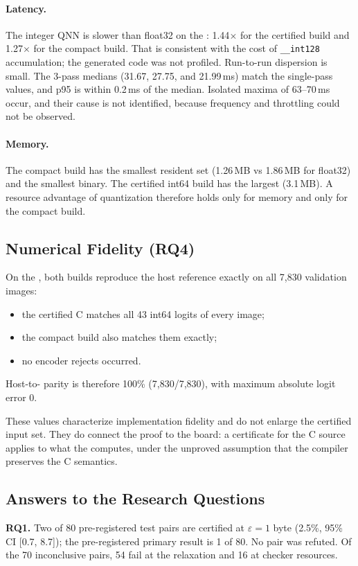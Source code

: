\paragraph{Latency.}
The integer QNN is slower than float32 on the \Aseven{}: 1.44$\times$ for the certified build and 1.27$\times$ for the compact build. That is consistent with the cost of \texttt{\_\_int128} accumulation; the generated code was not profiled. Run-to-run dispersion is small. The 3-pass medians (31.67, 27.75, and 21.99\,ms) match the single-pass values, and p95 is within 0.2\,ms of the median. Isolated maxima of 63--70\,ms occur, and their cause is not identified, because frequency and throttling could not be observed.

\paragraph{Memory.}
The compact build has the smallest resident set (1.26\,MB vs 1.86\,MB for float32) and the smallest binary. The certified int64 build has the largest (3.1\,MB). A resource advantage of quantization therefore holds only for memory and only for the compact build.



\subsection{Numerical Fidelity (RQ4)}
On the \Aseven{}, both builds reproduce the host reference exactly on all 7,830 validation images:
\begin{itemize}
  \item the certified C matches all 43 int64 logits of every image;
  \item the compact build also matches them exactly;
  \item no encoder rejects occurred.
\end{itemize}
Host-to-\Aseven{} parity is therefore 100\% (7,830/7,830), with maximum absolute logit error 0.



These values characterize implementation fidelity and do not enlarge the certified input set. They do connect the proof to the board: a certificate for the C source applies to what the \Aseven{} computes, under the unproved assumption that the compiler preserves the C semantics.

\subsection{Answers to the Research Questions}
\textbf{RQ1.} Two of 80 pre-registered test pairs are certified at $\varepsilon = 1$ byte (2.5\%, 95\% CI [0.7, 8.7]); the pre-registered primary result is 1 of 80. No pair was refuted. Of the 70 inconclusive pairs, 54 fail at the relaxation and 16 at checker resources.

